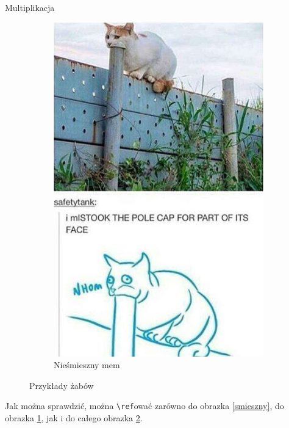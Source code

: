 \documentclass[handout]{beamer}
\newcommand{\tb}{\textbackslash}
\begin{document}
\begin{frame}[fragile]{Multiplikacja}{}
\begin{figure}
\begin{subfigure}[c]{0.45\textwidth}
        \includegraphics[width=\textwidth]{mem7}
        \caption{Nieśmieszny mem}
        \label{niesmieszny}
    \end{subfigure}
    \caption{Przykłady żabów}
    \label{memy}
\end{figure}

Jak można sprawdzić, można \texttt{\tb{ref}}ować zarówno do obrazka \ref{smieszny}, do obrazka \ref{niesmieszny}, jak i do całego obrazka \ref{memy}.

\end{frame}
\end{document}
